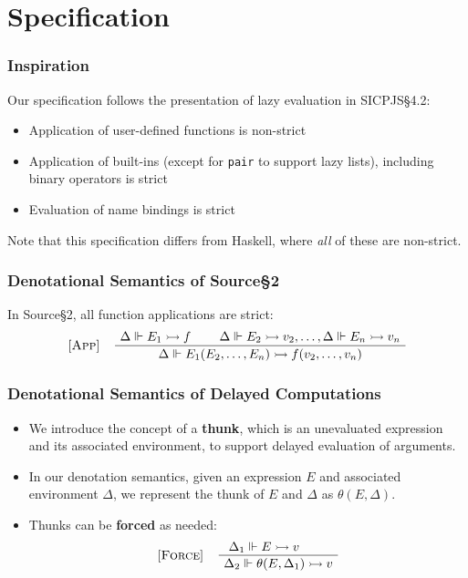 \documentclass[12pt]{beamer}
\makeatletter
\newenvironment{boxedprooftree}[1][c]
 {\begin{tabular}[#1]{@{}c@{}}}
 {\DisplayProof\end{tabular}}
\makeatother
\begin{document}
\section{Specification}

\begin{frame}
\frametitle{Inspiration}
Our specification follows the presentation of lazy evaluation in SICPJS\S4.2:\pause[1]
\begin{itemize}
\item<2->Application of user-defined functions is non-strict
\item<3->Application of built-ins (except for \texttt{pair} to support lazy lists), including binary operators is strict
\item<4->Evaluation of name bindings is strict
\end{itemize}
\pause[5]Note that this specification differs from Haskell, where \textit{all} of these are non-strict.
\end{frame}

\begin{frame}
\frametitle{Denotational Semantics of Source\S2}
In Source\S2, all function applications are strict:
\[
\begin{tabular}{@{} l c @{}}
[\textsc{App}] &
  \begin{boxedprooftree}
  \AxiomC{$\Delta\Vdash E_1\rightarrowtail f$}
  \AxiomC{$\Delta\Vdash E_2\rightarrowtail v_2,\ldots,\Delta\Vdash E_n\rightarrowtail v_n$}
  \BinaryInfC{$\Delta\Vdash E_1(E_2,\ldots,E_n)\rightarrowtail f(v_2,\ldots,v_n)$}
  \end{boxedprooftree}
\end{tabular}
\]
\end{frame}

\begin{frame}
\frametitle{Denotational Semantics of Delayed Computations}
\begin{itemize}
\item<1-> We introduce the concept of a \textbf{thunk}, which is an unevaluated expression and its associated environment, to support delayed evaluation of arguments.
\item<2-> In our denotation semantics, given an expression $E$ and associated environment $\Delta$, we represent the thunk of $E$ and $\Delta$ as $\theta(E, \Delta)$.
\item<3-> Thunks can be \textbf{forced} as needed:
\[
\begin{tabular}{@{} l c @{}}
[\textsc{Force}] &
  \begin{boxedprooftree}
  \AxiomC{$\Delta_1\Vdash E \rightarrowtail v$}
  \AxiomC{}
  \BinaryInfC{$\Delta_2\Vdash\theta(E, \Delta_1)\rightarrowtail v$}
  \end{boxedprooftree}
\end{tabular}
\]
\end{itemize}

\end{frame}
\end{document}
